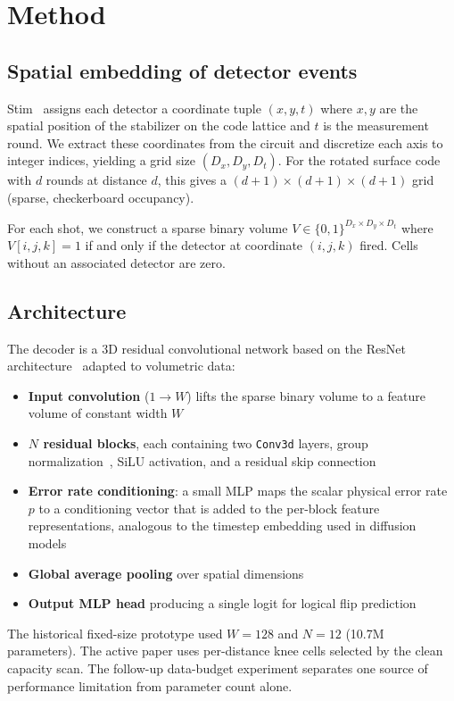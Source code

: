 \documentclass[11pt,a4paper]{article}
\begin{document}
\section{Method}

\subsection{Spatial embedding of detector events}

Stim~\cite{gidney2021stim} assigns each detector a coordinate tuple
$(x, y, t)$ where $x, y$ are the spatial position of the stabilizer on
the code lattice and $t$ is the measurement round. We extract these
coordinates from the circuit and discretize each axis to integer indices,
yielding a grid size $(D_x, D_y, D_t)$. For the rotated surface code
with $d$ rounds at distance $d$, this gives a $(d{+}1) \times (d{+}1)
\times (d{+}1)$ grid (sparse, checkerboard occupancy).

For each shot, we construct a sparse binary volume
$V \in \{0,1\}^{D_x \times D_y \times D_t}$ where $V[i, j, k] = 1$ if
and only if the detector at coordinate $(i, j, k)$ fired. Cells without
an associated detector are zero.

\subsection{Architecture}

The decoder is a 3D residual convolutional network based on the ResNet
architecture~\cite{he2016resnet} adapted to volumetric data:
\begin{itemize}[nosep]
  \item \textbf{Input convolution} ($1 \to W$) lifts the sparse binary
        volume to a feature volume of constant width $W$
  \item \textbf{$N$ residual blocks}, each containing two \texttt{Conv3d}
        layers, group normalization~\cite{wu2018groupnorm}, SiLU
        activation, and a residual skip connection
  \item \textbf{Error rate conditioning}: a small MLP maps the scalar
        physical error rate $p$ to a conditioning vector that is added to
        the per-block feature representations, analogous to the timestep
        embedding used in diffusion models~\cite{ho2020ddpm}
  \item \textbf{Global average pooling} over spatial dimensions
  \item \textbf{Output MLP head} producing a single logit for logical
        flip prediction
\end{itemize}
The historical fixed-size prototype used $W = 128$ and $N = 12$
(10.7M parameters). The active paper uses per-distance knee cells selected
by the clean capacity scan. The follow-up data-budget experiment separates
one source of performance limitation from parameter count alone.
\end{document}
